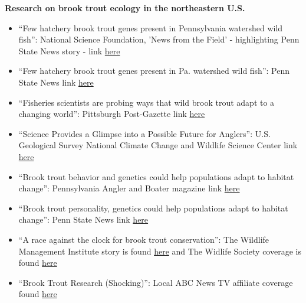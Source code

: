 \documentclass[10pt]{article}
\begin{document}
\begin{flushleft}
\textbf{Research on brook trout ecology in the northeastern U.S.}\\
\begin{itemize}
		\item  ``Few hatchery brook trout genes present in Pennsylvania watershed wild fish'': National Science Foundation, 'News from the Field' - highlighting Penn State News story - link \href{https://www.nsf.gov/news/news_summ.jsp?cntn_id=296716}{here}
	\item ``Few hatchery brook trout genes present in Pa. watershed wild fish'': Penn State News link \href{https://news.psu.edu/story/537280/2018/09/18/research/few-hatchery-brook-trout-genes-present-pa-watershed-wild-fish}{here}
\item ``Fisheries scientists are probing ways that wild brook trout adapt to a changing world'': Pittsburgh Post-Gazette link \href{http://www.post-gazette.com/sports/outdoors/2017/12/31/Fishery-scientists-are-probing-ways-that-wild-brook-trout-adapt-to-a-changing-world/stories/201712310280}{here}\\
\item ``Science Provides a Glimpse into a Possible Future for Anglers'': U.S. Geological Survey National Climate Change and Wildlife Science Center link
\href{https://nccwsc.usgs.gov/content/science-provides-glimpse-possible-future-anglers}{here}\\
\item ``Brook trout behavior and genetics could help populations adapt to habitat change'': Pennsylvania Angler and Boater magazine link
\href{http://www.fishandboat.com/Transact/AnglerBoater/AnglerBoater2017/MayJune/Documents/2017-0506mj-10brook.pdf}{here}\\
\item ``Brook trout personality, genetics could help populations adapt to habitat change'': Penn State News link 
\href{http://news.psu.edu/story/442050/2016/12/13/brook-trout-personality-genetics-could-help-populations-adapt-habitat-change}{here}\\
\item ``A race against the clock for brook trout conservation'': The Wildlife Management Institute story is found \href{https://wildlifemanagement.institute/outdoor-news-bulletin/september-2016/race-against-clock-brook-trout-conservation}{here} and The Widlife Society coverage is found
\href{http://wildlife.org/a-race-against-the-clock-for-brook-trout-conservation/}{here}\\
\item ``Brook Trout Research (Shocking)'': Local ABC News TV affiliate coverage found \href{http://wnep.com/2016/09/25/brook-trout-research-shocking/}{here}\\

\end{itemize}
\end{flushleft}
\end{document}
